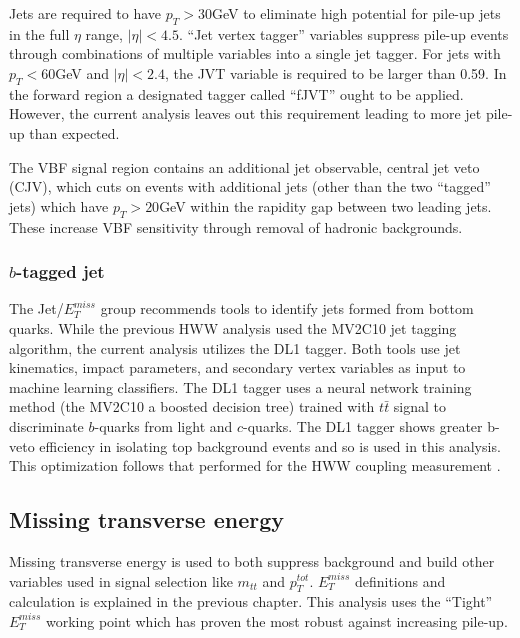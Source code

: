 Jets are required to have $p_T > 30$GeV to eliminate high potential for pile-up jets in the full $\eta$ range, $|\eta| < 4.5$. ``Jet vertex tagger'' variables suppress pile-up events through combinations of multiple variables into a single jet tagger. For jets with $p_T < 60$GeV and $|\eta| < 2.4$, the JVT variable is required to be larger than 0.59. In the forward region a designated tagger called ``fJVT'' ought to be applied. However, the current analysis leaves out this requirement leading to more jet pile-up than expected. 

The VBF signal region contains an additional jet observable, central jet veto (CJV), which cuts on events with additional jets (other than the two ``tagged'' jets) which have $p_T>20$GeV within the rapidity gap between two leading jets. These increase VBF sensitivity through removal of hadronic backgrounds.
\subsubsection{$b$-tagged jet}

The Jet/$E_T^{miss}$ group recommends tools to identify jets formed from bottom quarks. While the previous HWW analysis used the MV2C10 jet tagging algorithm, the current analysis utilizes the DL1 tagger. Both tools use jet kinematics, impact parameters, and secondary vertex variables as input to machine learning classifiers. The DL1 tagger uses a neural network training method (the MV2C10 a boosted decision tree) trained with $t\bar{t}$ signal to discriminate $b$-quarks from light and $c$-quarks. The DL1 tagger shows greater b-veto efficiency in isolating top background events and so is used in this analysis. This optimization follows that performed for the HWW coupling measurement \cite{HWWCoupling}. 

\subsection{Missing transverse energy}

Missing transverse energy is used to both suppress background and build other variables used in signal selection like $m_{tt}$ and $p_T^{tot}$. $E_T^{miss}$ definitions and calculation is explained in the previous chapter. This analysis uses the ``Tight'' $E_T^{miss}$ working point which has proven the most robust against increasing pile-up.

